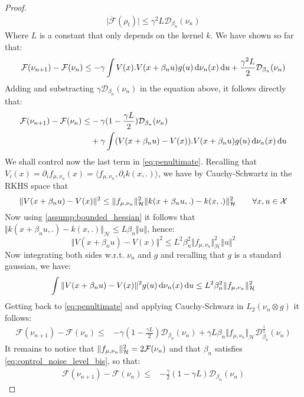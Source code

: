 \begin{proof}
	\begin{align}\label{eq:upper_bound_1}
	\vert  \ddot{\mathcal{F}}(\rho_t)   \vert\leq \gamma^2 L \mathcal{D}_{\beta_n}(\nu_n) 
	\end{align}
	Where $L$ is a constant that only depends on the kernel $k$. We have shown so far that:
	\[
	\mathcal{F}(\nu_{n+1})-\mathcal{F}(\nu_{n})\leq   -\gamma \int  V(x).V(x+\beta_n u) g(u)\mathop{}\!\mathrm{d}\nu_n(x)\mathop{}\!\mathrm{d} u +  \frac{\gamma^2L}{2}\mathcal{D}_{\beta_n}(\nu_n) 
	\]
	Adding and substracting  $\gamma \mathcal{D}_{\beta_n}(\nu_n)$ in the equation above, it follows directly that:
\begin{align}\label{eq:penultimate}
\begin{split}
			\mathcal{F}(\nu_{n+1})-\mathcal{F}(\nu_{n} )\leq &   -\gamma (1-\frac{\gamma L}{2} )\mathcal{D}_{\beta_n}(\nu_n)
 \\
 &+ \gamma\int  (V(x+\beta_n u) -V(x)).V(x+\beta_n u) g(u)\mathop{}\!\mathrm{d}\nu_n(x)\mathop{}\!\mathrm{d} u	
\end{split}
\end{align}
We shall control now the last term in \cref{eq:penultimate}. Recalling that   $ V_i(x) = \partial_i f_{\mu,\nu_n}(x) = \langle f_{\mu,\nu_n} , \partial_i k(x,.)\rangle $,  we have by Cauchy-Schwartz in the RKHS space that
\[
\Vert V(x+\beta_n u) -V(x)\Vert^2\leq \Vert f_{\mu,\nu_n} \Vert_{\mathcal{H}}^2  \Vert k(x+\beta_n u,.) -k(x,.)\Vert_{\mathcal{H}}^2\qquad \forall x,u \in {{\mathcal X}}
\]
Now using \cref{assump:bounded_hessian} it follows that $\Vert k(x+\beta_n u,.) -k(x,.)\Vert_{\mathcal{H}}\leq L \beta_n \Vert u \Vert  $, hence:
\[
\Vert V(x+\beta_n u) -V(x)\Vert^2 \leq L^2\beta^2_n \Vert f_{\mu,\nu_n} \Vert_{\mathcal{H}}^2 \Vert u \Vert^2
\]
Now integrating both sides w.r.t. $\nu_n$ and $g$ and recalling that $g$ is a standard gaussian, we have:
\begin{align}
	 \int  \Vert V(x+\beta_n u) -V(x)\Vert^2 g(u)\mathop{}\!\mathrm{d}\nu_n(x)\mathop{}\!\mathrm{d} u
\leq 
	L^2\beta^2_n\Vert f_{\mu,\nu_n} \Vert_{\mathcal{H}}^2
\end{align}
Getting back to \cref{eq:penultimate} and applying Cauchy-Schwarz in $L_2(\nu_n\otimes g)$ it follows:
\begin{align}
	\mathcal{F}(\nu_{n+1})-\mathcal{F}(\nu_{n} )\leq &   -\gamma (1-\frac{\gamma L}{2} )\mathcal{D}_{\beta_n}(\nu_n) +\gamma L\beta_n\Vert f_{\mu,\nu_n} \Vert_{\mathcal{H}}\mathcal{D}^{\frac{1}{2}}_{\beta_n}(\nu_n)
\end{align}
It remains to notice that $\Vert f_{\mu,\nu_n} \Vert_{\mathcal{H}}^2 = 2{{\mathcal F}}(\nu_n)$ and that $\beta_n$ satisfies \cref{eq:control_noise_level_bis}, so that:
\begin{align}
	\mathcal{F}(\nu_{n+1})-\mathcal{F}(\nu_{n} )\leq &   -\frac{\gamma}{2} (1-\gamma L )\mathcal{D}_{\beta_n}(\nu_n)
\end{align}
\end{proof}


